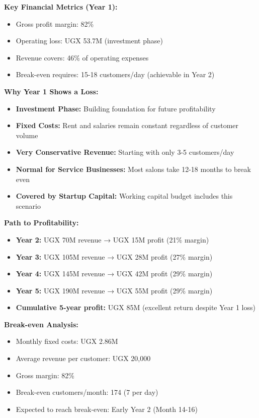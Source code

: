 \documentclass[a4paper,12pt]{article}
\begin{document}
\vspace{1em}

\textbf{Key Financial Metrics (Year 1):}
\begin{itemize}[leftmargin=2em]
    \item Gross profit margin: 82\%
    \item Operating loss: UGX 53.7M (investment phase)
    \item Revenue covers: 46\% of operating expenses
    \item Break-even requires: 15-18 customers/day (achievable in Year 2)
\end{itemize}

\vspace{1em}

\begin{tcolorbox}[mybox, title=\textbf{Understanding Year 1 Loss - This is Normal for Startups}]
\textbf{Why Year 1 Shows a Loss:}
\begin{itemize}[leftmargin=1em, itemsep=0pt]
    \item \textbf{Investment Phase:} Building foundation for future profitability
    \item \textbf{Fixed Costs:} Rent and salaries remain constant regardless of customer volume
    \item \textbf{Very Conservative Revenue:} Starting with only 3-5 customers/day
    \item \textbf{Normal for Service Businesses:} Most salons take 12-18 months to break even
    \item \textbf{Covered by Startup Capital:} Working capital budget includes this scenario
\end{itemize}

\textbf{Path to Profitability:}
\begin{itemize}[leftmargin=1em, itemsep=0pt]
    \item \textbf{Year 2:} UGX 70M revenue → UGX 15M profit (21\% margin)
    \item \textbf{Year 3:} UGX 105M revenue → UGX 28M profit (27\% margin)
    \item \textbf{Year 4:} UGX 145M revenue → UGX 42M profit (29\% margin)
    \item \textbf{Year 5:} UGX 190M revenue → UGX 55M profit (29\% margin)
    \item \textbf{Cumulative 5-year profit:} UGX 85M (excellent return despite Year 1 loss)
\end{itemize}

\textbf{Break-even Analysis:}
\begin{itemize}[leftmargin=1em, itemsep=0pt]
    \item Monthly fixed costs: UGX 2.86M
    \item Average revenue per customer: UGX 20,000
    \item Gross margin: 82\%
    \item Break-even customers/month: 174 (7 per day)
    \item Expected to reach break-even: Early Year 2 (Month 14-16)
\end{itemize}
\end{tcolorbox}
\end{document}

